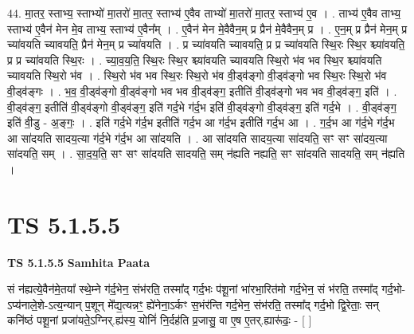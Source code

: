 \documentclass[17pt]{extarticle}
\begin{document}
44. मा॒तर॒ स्ताभ्य॒ स्ताभ्यो॑ मा॒तरो॑ मा॒तर॒ स्ताभ्य॑ ए॒वैव ताभ्यो॑ मा॒तरो॑ मा॒तर॒ स्ताभ्य॑ ए॒व । . ताभ्य॑ ए॒वैव ताभ्य॒ स्ताभ्य॑ ए॒वैन॑ मेन मे॒व ताभ्य॒ स्ताभ्य॑ ए॒वैन᳚म् । . ए॒वैन॑ मेन मे॒वैवैन॒म् प्र प्रैन॑ मे॒वैवैन॒म् प्र । . ए॒न॒म् प्र प्रैन॑ मेन॒म् प्र च्या॑वयति च्यावयति॒ प्रैन॑ मेन॒म् प्र च्या॑वयति । . प्र च्या॑वयति च्यावयति॒ प्र प्र च्या॑वयति स्थि॒रः स्थि॒र श्च्या॑वयति॒ प्र प्र च्या॑वयति स्थि॒रः । . च्या॒व॒य॒ति॒ स्थि॒रः स्थि॒र श्च्या॑वयति च्यावयति स्थि॒रो भ॑व भव स्थि॒र श्च्या॑वयति च्यावयति स्थि॒रो भ॑व । . स्थि॒रो भ॑व भव स्थि॒रः स्थि॒रो भ॑व वी॒ड्व॑ङ्गो वी॒ड्व॑ङ्गो भव स्थि॒रः स्थि॒रो भ॑व वी॒ड्व॑ङ्गः । . भ॒व॒ वी॒ड्व॑ङ्गो वी॒ड्व॑ङ्गो भव भव वी॒ड्व॑ङ्ग॒ इतीति॑ वी॒ड्व॑ङ्गो भव भव वी॒ड्व॑ङ्ग॒ इति॑ । . वी॒ड्व॑ङ्ग॒ इतीति॑ वी॒ड्व॑ङ्गो वी॒ड्व॑ङ्ग॒ इति॑ गर्द॒भे ग॑र्द॒भ इति॑ वी॒ड्व॑ङ्गो वी॒ड्व॑ङ्ग॒ इति॑ गर्द॒भे । . वी॒ड्व॑ङ्ग॒ इति॑ वी॒डु - अ॒ङ्गः॒ । . इति॑ गर्द॒भे ग॑र्द॒भ इतीति॑ गर्द॒भ आ ग॑र्द॒भ इतीति॑ गर्द॒भ आ । . ग॒र्द॒भ आ ग॑र्द॒भे ग॑र्द॒भ आ सा॑दयति सादय॒त्या ग॑र्द॒भे ग॑र्द॒भ आ सा॑दयति । . आ सा॑दयति सादय॒त्या सा॑दयति॒ सꣳ सꣳ सा॑दय॒त्या सा॑दयति॒ सम् । . सा॒द॒य॒ति॒ सꣳ सꣳ सा॑दयति सादयति॒ सम् न॑ह्यति नह्यति॒ सꣳ सा॑दयति सादयति॒ सम् न॑ह्यति । \newline
\pagebreak
{}

\section{ TS 5.1.5.5 }

\textbf{TS 5.1.5.5 } \newline
\textbf{Samhita Paata} \newline

सं न॑ह्यत्ये॒वैन॑मे॒तया᳚ स्थे॒म्ने ग॑र्द॒भेन॒ संभ॑रति॒ तस्मा᳚द् गर्द॒भः प॑शू॒नां भा॑रभा॒रित॑मो गर्द॒भेन॒ सं भ॑रति॒ तस्मा᳚द् गर्द॒भो-ऽप्य॑नाले॒शे-ऽत्य॒न्यान् प॒शून् मे᳚द्य॒त्यन्नꣳ॒॒ ह्ये॑नेना॒ऽर्कꣳ स॒भंर॑न्ति गर्द॒भेन॒ संभ॑रति॒ तस्मा᳚द् गर्द॒भो द्वि॒रेताः॒ सन् कनि॑ष्ठं पशू॒नां प्रजा॑यते॒ऽग्निर्.ह्य॑स्य॒ योनिं॑ नि॒र्दह॑ति प्र॒जासु॒ वा ए॒ष ए॒तर्.ह्यारू॑ढः॒ - [  ] \newline
\end{document}
